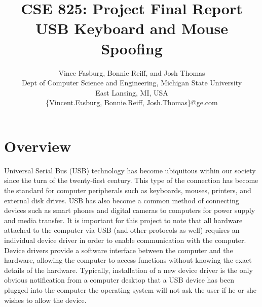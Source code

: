 \documentclass[pagenumbers]{ieee}
\begin{document}
\title{CSE 825: Project Final Report \\
USB Keyboard and Mouse Spoofing\\
}

\author{Vince Fasburg, Bonnie Reiff, and Josh Thomas\\
Dept of Computer Science and Engineering, Michigan State University\\
East Lansing, MI, USA\\
\{Vincent.Fasburg, Bonnie.Reiff, Josh.Thomas\}@ge.com\\
}

\maketitle
\thispagestyle{empty}

\section{Overview}

Universal Serial Bus (USB) technology has become ubiquitous within our society since the turn of the twenty-first century. This type of the connection has become the standard for computer peripherals such as keyboards, mouses, printers, and external disk drives. USB has also become a common method of connecting devices such as smart phones and digital cameras to computers for power supply and media transfer. It is important for this project to note that all hardware attached to the computer via USB (and other protocols as well) requires an individual device driver in order to enable communication with the computer. Device drivers provide a software interface between the computer and the hardware, allowing the computer to access functions without knowing the exact details of the hardware. Typically, installation of a new device driver is the only obvious notification from a computer desktop that a USB device has been plugged into the computer \textemdash{} the operating system will not ask the user if he or she wishes to allow the device.
\end{document}
